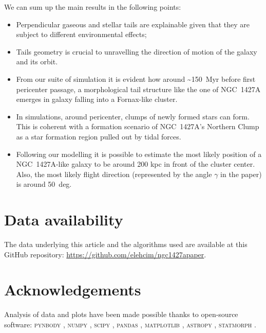 We can sum up the main results in the following points:
\begin{itemize}
    \item Perpendicular gaseous and stellar tails are explainable given that they are subject to different environmental effects;
    \item Tails geometry is crucial to unravelling the direction of motion of the galaxy and its orbit.
    \item From our suite of simulation it is evident how around \textasciitilde 150~Myr before first pericenter passage, a morphological tail structure like the one of NGC~1427A emerges in galaxy falling into a Fornax-like cluster.
    \item In simulations, around pericenter, clumps of newly formed stars can form. This is coherent with a formation scenario of NGC~1427A's Northern Clump as a star formation region pulled out by tidal forces.
    \item Following our modelling it is possible to estimate the most likely position of a NGC~1427A-like galaxy to be around 200 kpc in front of the cluster center. Also, the most likely flight direction (represented by the angle $\gamma$ in the paper) is around 50~deg.
\end{itemize}

\section*{Data availability}
The data underlying this article and the algorithms used are available at this GitHub repository: \url{https://github.com/elehcim/ngc1427apaper}.

\section*{Acknowledgements}
Analysis of data and plots have been made possible thanks to open-source software:
\textsc{pynbody} \citep{Pontzen2013},
\textsc{numpy} \citep{numpy},
\textsc{scipy} \citep{scipy},
\textsc{pandas} \citep{pandas},
\textsc{matplotlib} \citep{Hunter2004},
\textsc{astropy} \citep{TheAstropyCollaboration2018},
\textsc{statmorph} \citep{Rodriguez-Gomez2019}.
